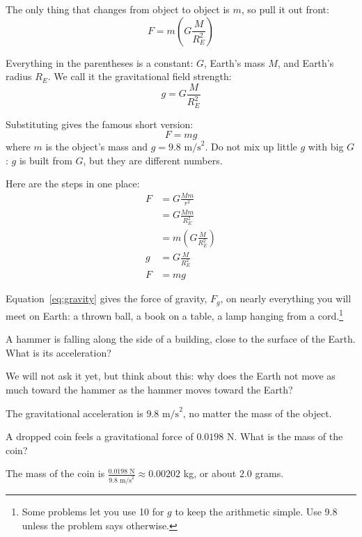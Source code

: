 The only thing that changes from object to object is $m$, so pull it out front:
\begin{equation}
  F = m \left( G \frac{M}{R_E^2} \right)
\end{equation}

Everything in the parentheses is a constant: $G$, Earth's mass $M$, and Earth's radius $R_E$. We call it the gravitational field strength:
\begin{equation}
  g = G \frac{M}{R_E^2}
\end{equation}

Substituting gives the famous short version:
\begin{equation}
  F=mg \label{eq:gravity}
\end{equation}
where $m$ is the object's mass and $g=9.8 \text{ m/s}^2$. Do not mix up little $g$ with big $G$: $g$ is built from $G$, but they are different numbers.

Here are the steps in one place:
\begin{align*}
  F & = G \frac{Mm}{r^2}                   \\
    & = G \frac{Mm}{R_E^2}                 \\
    & = m \left( G \frac{M}{R_E^2} \right) \\
  g & = G \frac{M}{R_E^2}                  \\
  F & = mg
\end{align*}

Equation~\ref{eq:gravity} gives the force of gravity, $F_g$, on nearly everything you will meet on Earth: a thrown ball, a book on a table, a lamp hanging from a cord.\footnote{Some problems let you use 10 for $g$ to keep the arithmetic simple. Use 9.8 unless the problem says otherwise.}

\begin{Exercise}[title=May the Force be with You 1, label=grav1]
  A hammer is falling along the side of a building, close to the surface of the Earth. What is its acceleration?

  We will not ask it yet, but think about this: why does the Earth not move as much toward the hammer as the hammer moves toward the Earth?
\end{Exercise}

\begin{Answer}[ref=grav1]
  The gravitational acceleration is $9.8 \text{ m/s}^2$, no matter the mass of the object.
\end{Answer}
\begin{Exercise}[title=May the Force be with You 2, label=grav2]
  A dropped coin feels a gravitational force of $0.0198 \text{ N}$. What is the mass of the coin?
\end{Exercise}
\begin{Answer}[ref=grav2]
  The mass of the coin is $\frac{0.0198 \text{ N}}{9.8 \text{ m/s}^2} \approx 0.00202$ kg, or about $2.0$ grams.
\end{Answer}
